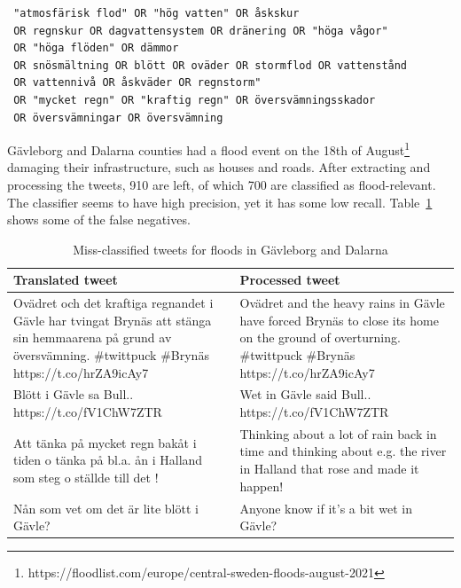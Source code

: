 \begin{verbatim}
 "atmosfärisk flod" OR "hög vatten" OR åskskur
 OR regnskur OR dagvattensystem OR dränering OR "höga vågor"
 OR "höga flöden" OR dämmor
 OR snösmältning OR blött OR oväder OR stormflod OR vattenstånd
 OR vattennivå OR åskväder OR regnstorm"
 OR "mycket regn" OR "kraftig regn" OR översvämningsskador
 OR översvämningar OR översvämning
\end{verbatim}

Gävleborg and Dalarna counties had a flood event on the 18th of
August\footnote{https://floodlist.com/europe/central-sweden-floods-august-2021} damaging their
infrastructure, such as houses and roads. After extracting and processing the tweets, 910 are left,
of which 700 are classified as flood-relevant. The classifier seems to have high precision, yet it
has some low recall. Table~\ref{tab:tweets_missclassified_gavle} shows some of the false negatives.

\begin{table}
  \center
  \begin{tabular}{|p{7.5cm}|p{7.5cm}|}
    \hline
    Translated tweet & Processed tweet\\
    \hline
    Ovädret och det kraftiga regnandet i Gävle har tvingat Brynäs att stänga sin hemmaarena på grund av
    översvämning. \#twittpuck \#Brynäs https://t.co/hrZA9icAy7 &
    Ovädret and the heavy rains in Gävle have forced Brynäs to close its home on the ground of
    overturning. \#twittpuck \#Brynäs https://t.co/hrZA9icAy7 \\
    \hline
    Blött i Gävle sa Bull.. https://t.co/fV1ChW7ZTR &
    Wet in Gävle said Bull.. https://t.co/fV1ChW7ZTR \\
    \hline
    Att tänka på mycket regn bakåt i tiden o tänka på bl.a. ån i Halland som steg o ställde till det !&
    Thinking about a lot of rain back in time and thinking about e.g. the river in Halland that rose and
    made it happen! \\
    \hline
    Nån som vet om det är lite blött i Gävle?&
    Anyone know if it's a bit wet in Gävle? \\
    \hline
  \end{tabular}
  \caption{Miss-classified tweets for floods in Gävleborg and Dalarna}
  \label{tab:tweets_missclassified_gavle}
\end{table}

